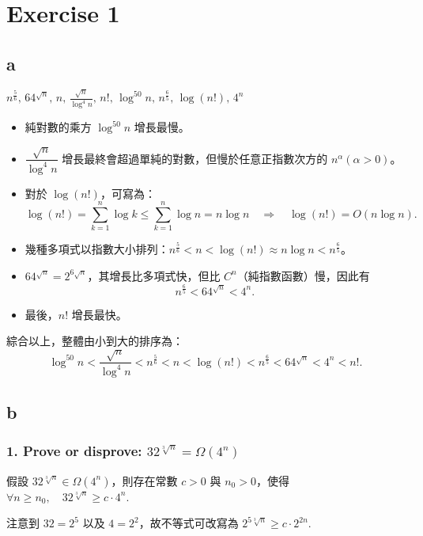 \documentclass[8pt, fleqn]{report}
\author{R13621202}
\date{March 28}
\begin{document}
\section*{Exercise 1}

\subsection*{a}
\(n^{\frac{5}{6}}, \, 64^{\sqrt{n}}, \, n, \, \frac{\sqrt{n}}{\log^4 n}, \, n!, \, \log^{50} n, \, n^{\frac{6}{5}}, \, \log(n!), \, 4^n\)

\begin{itemize}
    \item 純對數的乘方 \(\log^{50} n\) 增長最慢。
    \item \(\dfrac{\sqrt{n}}{\log^4 n}\) 增長最終會超過單純的對數，但慢於任意正指數次方的 \(n^\alpha (\alpha > 0)\)。
    \item 對於 \(\log(n!)\)，可寫為：
          \[
              \log(n!) = \sum_{k=1}^n \log k \leq \sum_{k=1}^n \log n = n \log n \quad \Rightarrow \quad \log(n!) = O(n \log n).
          \]
    \item 幾種多項式以指數大小排列：\(n^{\frac{5}{6}} < n < \log(n!) \approx n \log n < n^{\frac{6}{5}}\)。
    \item \(64^{\sqrt{n}} = 2^{6 \sqrt{n}}\)，其增長比多項式快，但比 \(C^n\)（純指數函數）慢，因此有
          \[
              n^{\frac{6}{5}} < 64^{\sqrt{n}} < 4^n.
          \]
    \item 最後，\(n!\) 增長最快。
\end{itemize}

綜合以上，整體由小到大的排序為：
\[
    \log^{50} n < \frac{\sqrt{n}}{\log^4 n} < n^{\frac{5}{6}} < n < \log(n!) < n^{\frac{6}{5}} < 64^{\sqrt{n}} < 4^n < n!.
\]

\subsection*{b}

\subsubsection*{1. Prove or disprove: \(32^{\sqrt[3]{n}} = \Omega(4^n)\)}
假設 \(32^{\sqrt[3]{n}} \in \Omega(4^n)\)，則存在常數 \(c > 0\) 與 \(n_0 > 0\)，使得 \(\forall n \geq n_0, \quad 32^{\sqrt[3]{n}} \geq c \cdot 4^n\).

注意到 \(32 = 2^5\) 以及 \(4 = 2^2\)，故不等式可改寫為 \(2^{5\sqrt[3]{n}} \geq c \cdot 2^{2n}\).
\end{document}
